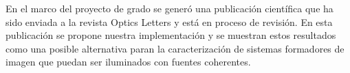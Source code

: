 En el marco del proyecto de grado se generó una
publicación científica que ha sido enviada a la revista Optics Letters
y está en proceso de revisión. En esta publicación se propone nuestra
implementación y se muestran estos resultados como una posible
alternativa paran la caracterización de sistemas formadores de imagen
que puedan ser iluminados con fuentes 
coherentes. 

\newpage
\pagebreak[4]

